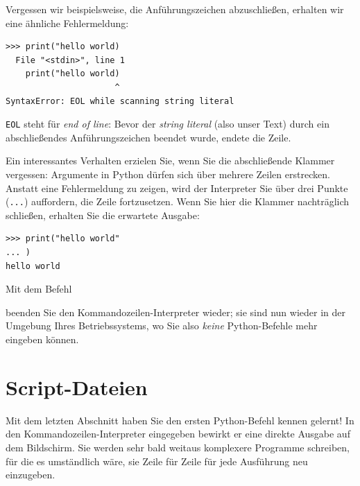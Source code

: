 Vergessen wir beispielsweise, die Anführungszeichen abzuschließen, erhalten wir eine ähnliche Fehlermeldung:

\begin{cmdbox}
\begin{verbatim}
>>> print("hello world)
  File "<stdin>", line 1
    print("hello world)
                      ^
SyntaxError: EOL while scanning string literal
\end{verbatim}
\end{cmdbox}
\texttt{EOL} steht für \emph{end of line}: Bevor der \emph{string literal} (also unser Text) durch ein abschließendes Anführungszeichen beendet wurde, endete die Zeile.

Ein interessantes Verhalten erzielen Sie, wenn Sie die abschließende Klammer vergessen: Argumente in Python dürfen sich über mehrere Zeilen erstrecken. Anstatt eine Fehlermeldung zu zeigen, wird der Interpreter Sie über drei Punkte (\texttt{...}) auffordern, die Zeile fortzusetzen. Wenn Sie hier die Klammer nachträglich schließen, erhalten Sie die erwartete Ausgabe:
\begin{cmdbox}
\begin{verbatim}
>>> print("hello world"
... )
hello world
\end{verbatim}
\end{cmdbox}

Mit dem Befehl
\begin{center}
\end{center}
beenden Sie den Kommandozeilen-Interpreter wieder; sie sind nun wieder in der Umgebung Ihres Betriebssystems, wo Sie also \emph{keine} Python-Befehle mehr eingeben können.



\section{Script-Dateien} \label{sec:Scripts}
Mit dem letzten Abschnitt haben Sie den ersten Python-Befehl  kennen gelernt! In den Kommandozeilen-Interpreter eingegeben bewirkt er eine direkte Ausgabe auf dem Bildschirm. Sie werden sehr bald weitaus komplexere Programme schreiben, für die es umständlich wäre, sie Zeile für Zeile für jede Ausführung neu einzugeben.

